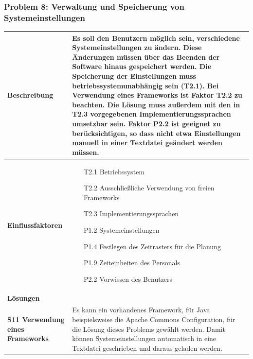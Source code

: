 \documentclass[fontsize=12pt,paper=a4,twoside]{scrartcl}
\begin{document}
\subsubsection{Problem 8: Verwaltung und Speicherung von Systemeinstellungen}
\begin{tabularx}{\textwidth}{|p{6cm}|X|}
 \hline
 \textbf{Beschreibung} & 
Es soll den Benutzern möglich sein, verschiedene Systemeinstellungen zu ändern. Diese Änderungen müssen über das Beenden der Software hinaus gespeichert werden. Die Speicherung der Einstellungen muss betriebssystemunabhängig sein (T2.1). Bei Verwendung eines Frameworks ist Faktor T2.2 zu beachten. Die Lösung muss außerdem mit den in T2.3 vorgegebenen Implementierungssprachen umsetzbar sein. Faktor P2.2 ist geeignet zu berücksichtigen, so dass nicht etwa Einstellungen manuell in einer Textdatei geändert werden müssen. \\\hline
 \textbf{Einflussfaktoren} &
 \begin{itemize}
\item[T2.1] Betriebssystem
\item[T2.2] Ausschließliche Verwendung von freien Frameworks
\item[T2.3] Implementierungssprachen
\item[P1.2] Systemeinstellungen
\item[P1.4] Festlegen des Zeitrasters für die Planung
\item[P1.9] Zeiteinheiten des Personals
\item[P2.2] Vorwissen des Benutzers
 \end{itemize}\\\hline
\multicolumn{2}{|l|}{\textbf{Lösungen}} \\\hline
\textbf{S11 Verwendung eines Frameworks} & Es kann ein vorhandenes Framework, für Java beispielsweise die Apache Commons Configuration, für die Lösung dieses Problems gewählt werden. Damit können Systemeinstellungen automatisch in eine Textdatei geschrieben und daraus geladen werden.\\\hline
\end{tabularx}
\newpage
\end{document}
